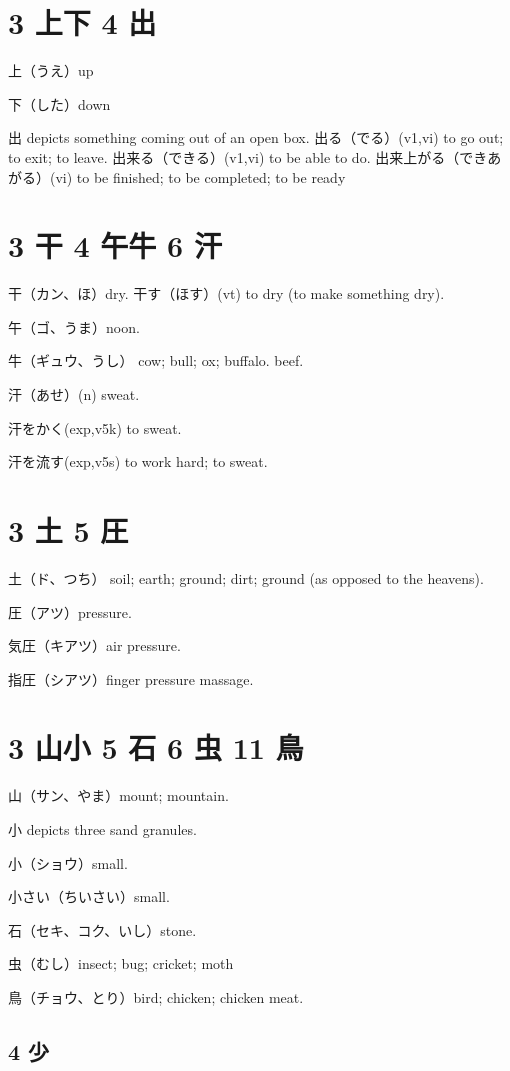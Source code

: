 \section{3 上下 4 出}

上（うえ）up

下（した）down

出 depicts something coming out of an open box.
出る（でる）(v1,vi) to go out; to exit; to leave.
出来る（できる）(v1,vi) to be able to do.
出来上がる（できあがる）(vi) to be finished; to be completed; to be ready

\section{3 干 4 午牛 6 汗}

干（カン、ほ）dry.
干す（ほす）(vt) to dry (to make something dry).

午（ゴ、うま）noon.

牛（ギュウ、うし）
cow; bull; ox; buffalo.
beef.

汗（あせ）(n) sweat.

汗をかく(exp,v5k) to sweat.

汗を流す(exp,v5s) to work hard; to sweat.

\section{3 土 5 圧}

土（ド、つち）
soil; earth; ground; dirt; ground (as opposed to the heavens).

圧（アツ）pressure.

気圧（キアツ）air pressure.

指圧（シアツ）finger pressure massage.

\section{3 山小 5 石 6 虫 11 鳥}

山（サン、やま）mount; mountain.

小 depicts three sand granules.

小（ショウ）small.

小さい（ちいさい）small.

石（セキ、コク、いし）stone.

虫（むし）insect; bug; cricket; moth

鳥（チョウ、とり）bird; chicken; chicken meat.

\subsection{4 少}

